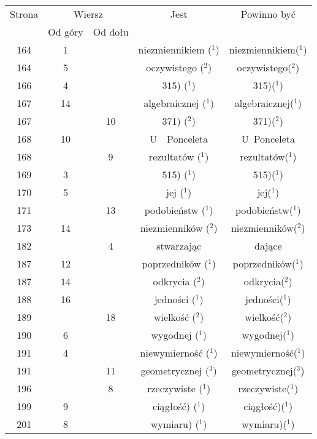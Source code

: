 \documentclass[a4paper,11pt]{article}
\numberwithin{equation}{section}
\begin{document}
\begin{center}
  \begin{tabular}{|c|c|c|c|c|}
    \hline
    Strona & \multicolumn{2}{c|}{Wiersz} & Jest
                              & Powinno być \\ \cline{2-3}
    & Od góry & Od dołu & & \\
    \hline
    164 & \hphantom{0}1 & & niezmiennikiem ($^{ 1 }$)
    & niezmiennikiem($^{ 1 }$) \\
    164 & \hphantom{0}5 & & oczywistego ($^{ 2 }$) & oczywistego($^{ 2 }$) \\
    166 & \hphantom{0}4 & & 315) ($^{ 1 }$) & 315)($^{ 1 }$) \\
    167 & 14 & & algebraicznej ($^{ 1 }$) & algebraicznej($^{ 1 }$) \\
    167 & & 10 & 371) ($^{ 2 }$) & 371)($^{ 2 }$) \\
    168 & 10 & & U~~Ponceleta & U~Ponceleta \\
    168 & & \hphantom{0}9 & rezultatów ($^{ 1 }$) & rezultatów($^{ 1 }$) \\
    169 & \hphantom{0}3 & & 515) ($^{ 1 }$) & 515)($^{ 1 }$) \\
    170 & \hphantom{0}5 & & jej ($^{ 1 }$) & jej($^{ 1 }$) \\
    171 & & 13 & podobieństw ($^{ 1 }$) & podobieństw($^{ 1 }$) \\
    173 & 14 & & niezmienników ($^{ 2 }$) & niezmienników($^{ 2 }$) \\
    182 & & \hphantom{0}4 & stwarzając & dające \\
    187 & 12 & & poprzedników ($^{ 1 }$) & poprzedników($^{ 1 }$) \\
    187 & 14 & & odkrycia ($^{ 2 }$) & odkrycia($^{ 2 }$) \\
    188 & 16 & & jedności ($^{ 1 }$) & jedności($^{ 1 }$) \\
    189 & & 18 & wielkość ($^{ 2 }$) & wielkość($^{ 2 }$) \\
    190 & \hphantom{0}6 & & wygodnej ($^{ 1 }$) & wygodnej($^{ 1 }$) \\
    191 & \hphantom{0}4 & & niewymierność ($^{ 1 }$)
    & niewymierność($^{ 1 }$) \\
    191 & & 11 & geometrycznej ($^{ 3 }$) & geometrycznej($^{ 3 }$) \\
    196 & & \hphantom{0}8 & rzeczywiste ($^{ 1 }$) & rzeczywiste($^{ 1 }$) \\
    199 & \hphantom{0}9 & & ciągłość) ($^{ 1 }$) & ciągłość)($^{ 1 }$) \\
    201 & \hphantom{0}8 & & wymiaru) ($^{ 1 }$) & wymiaru)($^{ 1 }$) \\

\end{tabular}
\end{center}
\end{document}

